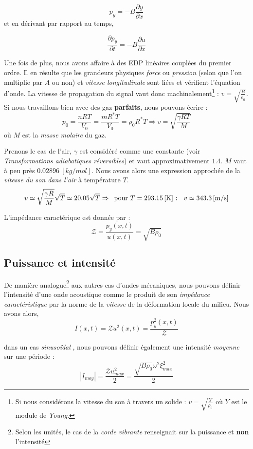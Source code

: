 \[p_{y}  = - B \frac{\partial y}{\partial x}\] et en dérivant par rapport au temps,

\[\frac{\partial p_{y}}{\partial t} =  - B \frac{\partial u}{\partial x}\]


Une fois de plus, nous avons affaire à des EDP linéaires couplées du premier ordre. Il en résulte que les grandeurs physiques \textit{force} ou \textit{pression} (selon que l'on multiplie par $A$ ou non) et 
\textit{vitesse longitudinale} sont liées et vérifient l'équation d'onde. La vitesse de propagation du signal vaut donc machinalement\footnote{Si nous considérons la vitesse du son à travers un solide : $v = \sqrt{\frac{Y}{\rho_{0}}}$ où $Y$ est le module de \textit{Young}.} : $v = \sqrt{\frac{B}{\rho_{0}}}$.  Si nous travaillons bien avec des
gaz \textbf{parfaits}, nous pouvons écrire : $$p_{0} = \frac{nRT}{V_{0}}= \frac{mR^{*}T}{V_{0}} = \rho_{0}R^{*}T \Rightarrow v = \sqrt{\frac{\gamma RT}{M}}$$ où $M$ est la \textit{masse molaire} du gaz.

Prenons le cas de l'air, $\gamma$ est considéré comme une constante (voir \textit{Transformations adiabatiques réversibles}) et vaut approximativement $1.4$. $M$ vaut à peu près $\SI{0.02896}{[kg/mol]}$. Nous avons alors une expression approchée de la \textit{vitesse du son dans l'air} à température $T$. 
\[ v \simeq \sqrt{\frac{\gamma R}{M}} \sqrt{T} \simeq 20.05 \sqrt{T} \Rightarrow \hspace{5 pt} \mbox{pour $T = \SI{293.15}{[K]}$ : } \hspace{5pt} v \simeq \SI{343.3}{[m/s]}\]

L'impédance caractérique est donnée par :
\[
    \mathcal{Z} = \frac{p_y(x,t)}{u(x,t)} = \sqrt{B\rho_0}
\]

\subsection{Puissance et intensité}

De manière analogue\footnote{Selon les unités, le cas de la \textit{corde vibrante} renseignait sur la puissance et \textbf{non} l'intensité} aux autres cas d'ondes mécaniques, nous pouvons définir l'intensité d'une onde acoustique comme le produit de son \textit{impédance caractéristique}
par la norme de la \textit{vitesse} de la déformation locale du milieu.
Nous avons alors, 
\[I(x,t) = \mathcal{Z} u^{2}(x,t) = \frac{p_{y}^{2}(x,t)}{\mathcal{Z}}\]

dans un cas \textit{sinusoïdal}%
, nous pouvons définir également une intensité \textit{moyenne} sur une période : \[ |I_{moy}| = \frac{\mathcal{Z} u^{2}_{max}}{2} = \frac{\sqrt{B \rho_{0}} \omega^{2} \xi_{max}^{2}}{2}\]

